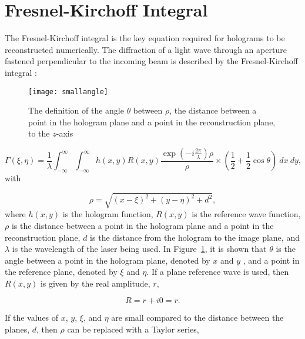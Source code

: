\section{Fresnel-Kirchoff Integral}

The Fresnel-Kirchoff integral is the key equation required for holograms
to be reconstructed numerically.
The diffraction of a light wave through an aperture fastened perpendicular
to the incoming beam is described by the Fresnel-Kirchoff integral
\cite{schnars_digital_2002}:

    \begin{figure}
    \begin{center}
        \texttt{[image: smallangle]}
    \end{center}
    \caption{The definition of the angle $\theta$ between $\rho$, the distance between a point
    in the hologram plane and a point in the reconstruction plane,
    to the $z$-axis}
    \label{fig:smallangle}
    \end{figure}

\begin{equation}
    \Gamma(\xi,\eta) =
    \frac{1}{\lambda}\int_{-\infty}^{\infty}\int_{-\infty}^{\infty}h(x,y)R(x,y)\frac{\exp\left(
        -i\frac{2\pi}{\lambda} \right)\rho}{\rho}\times \left(
        \frac{1}{2}+\frac{1}{2}\cos\theta \right)~dx~dy,
        \label{fresnel-kirchoff}
    \end{equation}
    with

    \begin{equation}
        \rho = \sqrt{(x-\xi)^{2}+(y-\eta)^{2}+d^{2}} ,
    \end{equation}
    where $h(x,y)$ is the hologram function, $R(x,y)$ is the reference wave
    function, $\rho$ is the distance between a point in the hologram plane and
    a point in the reconstruction plane, $d$ is the distance from the hologram
    to the image plane, and $\lambda$ is the wavelength of the laser being used. 
    In Figure~\ref{fig:smallangle}, it is shown that $\theta$ is the angle
    between a point in the hologram plane, denoted by $x$ and $y$
    , and a point in the reference plane, denoted by $\xi$ and
    $\eta$.
    If a plane reference wave is used,
    then $R(x,y)$ is given by the real amplitude, $r$,

    \begin{equation}
        R = r+ i0 = r .
    \end{equation}

    If the values of $x$, $y$, 
    $\xi$, and $\eta$ are
    small compared to the distance between the planes, $d$, then $\rho$ can be
    replaced with a Taylor series,

